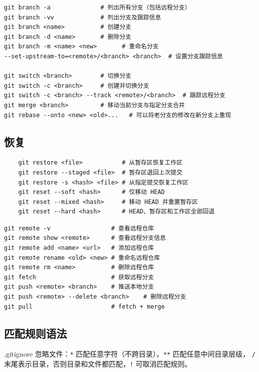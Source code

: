 \begin{code}[title=branch]
	\begin{verbatim}
git branch -a              # 列出所有分支（包括远程分支）
git branch -vv             # 列出分支及跟踪信息
git branch <name>          # 创建分支
git branch -d <name>       # 删除分支
git branch -m <name> <new>       # 重命名分支
--set-upstream-to=<remote>/<branch> <branch>  # 设置分支跟踪信息

git switch <branch>        # 切换分支
git switch -c <branch>     # 创建并切换分支
git switch -c <branch> --track <remote>/<branch>  # 跟踪远程分支
git merge <branch>         # 移动当前分支与指定分支合并
git rebase --onto <new> <old>...   # 可以将老分支的修改在新分支上重现
\end{verbatim}
\end{code}

\subsection{恢复}
\begin{verbatim}
	git restore <file>           # 从暂存区恢复工作区
	git restore --staged <file>  # 暂存区退回上次提交
	git restore -s <hash> <file> # 从指定提交恢复工作区
	git reset --soft <hash>      # 仅移动 HEAD
	git reset --mixed <hash>     # 移动 HEAD 并重置暂存区
	git reset --hard <hash>      # HEAD、暂存区和工作区全部回退
\end{verbatim}

\begin{code}[title=remote]
	\begin{verbatim}
git remote -v                 # 查看远程仓库
git remote show <remote>      # 查看远程分支信息
git remote add <name> <url>   # 添加远程仓库
git remote rename <old> <new> # 重命名远程仓库
git remote rm <name>          # 删除远程仓库
git fetch                     # 获取远程分支
git push <remote> <branch>    # 推送本地分支
git push <remote> --delete <branch>    # 删除远程分支
git pull                      # fetch + merge
\end{verbatim}
\end{code}

\subsection{匹配规则语法}
.gitignore 忽略文件：\verb|*| 匹配任意字符（不跨目录），\verb|**| 匹配任意中间目录层级，
\verb|/| 末尾表示目录，否则目录和文件都匹配，\verb|!| 可取消匹配规则。


